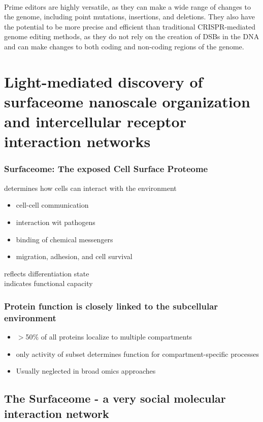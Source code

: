 \begin{itemize}
\begin{itemize}
\\Prime editors are highly versatile, as they can make a wide range of changes to the genome, including point mutations, insertions, and deletions. They also have the potential to be more precise and efficient than traditional CRISPR-mediated genome editing methods, as they do not rely on the creation of DSBs in the DNA and can make changes to both coding and non-coding regions of the genome.


\section{Light-mediated discovery of surfaceome nanoscale
organization and intercellular receptor interaction networks}
\subsubsection{Surfaceome: The exposed Cell Surface
Proteome}
determines how cells can interact with the environment
\begin{itemize}
    \item cell-cell communication
    \item interaction wit pathogens
    \item binding of chemical messengers
    \item migration, adhesion, and cell survival
\end{itemize}
reflects differentiation state
\\indicates functional capacity


\subsubsection{Protein function is closely linked to the subcellular environment}
\begin{itemize}
    \item $>$50$\%$ of all proteins localize to multiple compartments
    \item only activity of subset determines function for compartment-specific processes
    \item Usually neglected in broad omics approaches
\end{itemize}

\subsection{The Surfaceome - a very social molecular interaction network}


\end{itemize}
\end{itemize}
